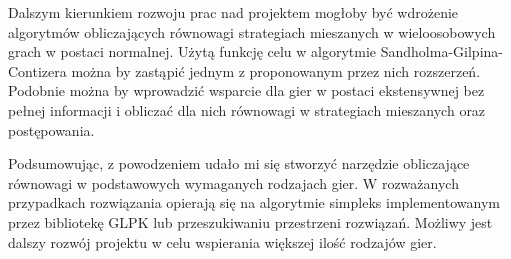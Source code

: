 \documentclass[polish]{standalone}
\begin{document}
Dalszym kierunkiem rozwoju prac nad projektem mogłoby być wdrożenie algorytmów obliczających równowagi strategiach
mieszanych w wieloosobowych grach w postaci normalnej. Użytą funkcję celu w algorytmie Sandholma-Gilpina-Contizera można
by zastąpić jednym z proponowanym przez nich rozszerzeń. Podobnie można by wprowadzić wsparcie dla gier w postaci
ekstensywnej bez pełnej informacji i obliczać dla nich równowagi w strategiach mieszanych oraz postępowania.

Podsumowując, z powodzeniem udało mi się stworzyć narzędzie obliczające równowagi w podstawowych wymaganych rodzajach
gier. W rozważanych przypadkach rozwiązania opierają się na algorytmie simpleks implementowanym przez bibliotekę GLPK
lub przeszukiwaniu przestrzeni rozwiązań. Możliwy jest dalszy rozwój projektu w celu wspierania większej ilość rodzajów
gier.
\end{document}
